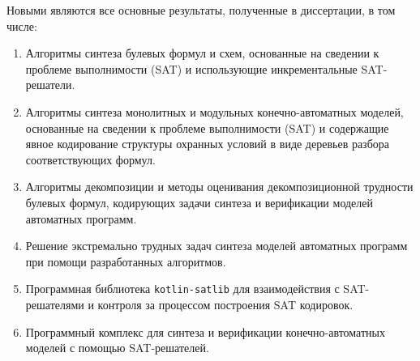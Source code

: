 \novelty
%
Новыми являются все основные результаты, полученные в диссертации, в том числе:
\begin{enumerate}[beginpenalty=10000]
    \item Алгоритмы синтеза булевых формул и схем, основанные на сведении к проблеме выполнимости (SAT) и использующие инкрементальные SAT-решатели.

    \item Алгоритмы синтеза монолитных и модульных конечно-автоматных моделей, основанные на сведении к проблеме выполнимости (SAT) и содержащие явное кодирование структуры охранных условий в виде деревьев разбора соответствующих формул.

    \item Алгоритмы декомпозиции и методы оценивания декомпозиционной трудности булевых формул, кодирующих задачи синтеза и верификации моделей автоматных программ.

    \item Решение экстремально трудных задач синтеза моделей автоматных программ при помощи разработанных алгоритмов.

    \item Программная библиотека \texttt{kotlin-satlib} для взаимодействия с SAT-решателями и контроля за процессом построения SAT кодировок.

    \item Программный комплекс  для синтеза и верификации конечно-автоматных моделей с помощью SAT-решателей.
\end{enumerate}


